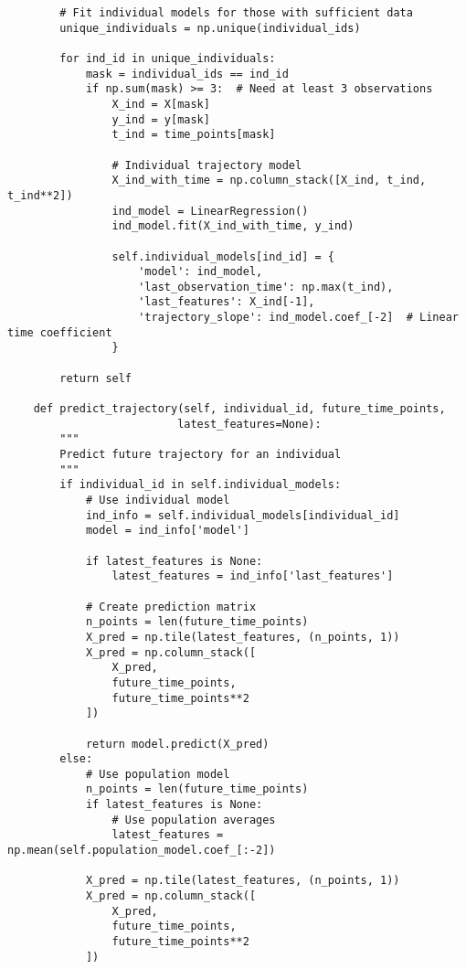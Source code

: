 \begin{lstlisting}
        # Fit individual models for those with sufficient data
        unique_individuals = np.unique(individual_ids)
        
        for ind_id in unique_individuals:
            mask = individual_ids == ind_id
            if np.sum(mask) >= 3:  # Need at least 3 observations
                X_ind = X[mask]
                y_ind = y[mask]
                t_ind = time_points[mask]
                
                # Individual trajectory model
                X_ind_with_time = np.column_stack([X_ind, t_ind, t_ind**2])
                ind_model = LinearRegression()
                ind_model.fit(X_ind_with_time, y_ind)
                
                self.individual_models[ind_id] = {
                    'model': ind_model,
                    'last_observation_time': np.max(t_ind),
                    'last_features': X_ind[-1],
                    'trajectory_slope': ind_model.coef_[-2]  # Linear time coefficient
                }
        
        return self
    
    def predict_trajectory(self, individual_id, future_time_points, 
                          latest_features=None):
        """
        Predict future trajectory for an individual
        """
        if individual_id in self.individual_models:
            # Use individual model
            ind_info = self.individual_models[individual_id]
            model = ind_info['model']
            
            if latest_features is None:
                latest_features = ind_info['last_features']
            
            # Create prediction matrix
            n_points = len(future_time_points)
            X_pred = np.tile(latest_features, (n_points, 1))
            X_pred = np.column_stack([
                X_pred, 
                future_time_points, 
                future_time_points**2
            ])
            
            return model.predict(X_pred)
        else:
            # Use population model
            n_points = len(future_time_points)
            if latest_features is None:
                # Use population averages
                latest_features = np.mean(self.population_model.coef_[:-2])
            
            X_pred = np.tile(latest_features, (n_points, 1))
            X_pred = np.column_stack([
                X_pred,
                future_time_points,
                future_time_points**2
            ])
            

\end{lstlisting}
